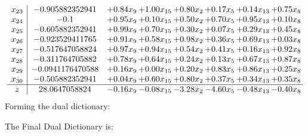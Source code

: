 \documentclass[8pt]{article}
\begin{document}
\[\begin{array}{c| c c@{\hskip 2pt} c@{\hskip 2pt} c@{\hskip 2pt} c@{\hskip 2pt} c@{\hskip 2pt} c@{\hskip 2pt} }
 x_{23}   &  -0.905882352941 & +  0.84 x_{9} & +  1.00 x_{15} & +  0.80 x_{2} & +  0.17 x_{5} & +  0.14 x_{13} & +  0.75 x_{8}\\
 x_{24}   &  -0.1 & +  0.95 x_{9} & +  0.10 x_{15} & +  0.50 x_{2} & +  0.70 x_{5} & +  0.95 x_{13} & +  0.10 x_{8}\\
 x_{25}   &  -0.605882352941 & +  0.99 x_{9} & +  0.70 x_{15} & +  0.30 x_{2} & +  0.07 x_{5} & +  0.29 x_{13} & +  0.45 x_{8}\\
 x_{26}   &  -0.923529411765 & +  0.91 x_{9} & +  0.58 x_{15} & +  0.98 x_{2} & +  0.36 x_{5} & +  0.69 x_{13} & +  0.03 x_{8}\\
 x_{27}   &  -0.517647058824 & +  0.97 x_{9} & +  0.94 x_{15} & +  0.54 x_{2} & +  0.41 x_{5} & +  0.16 x_{13} & +  0.92 x_{8}\\
 x_{28}   &  -0.311764705882 & +  0.78 x_{9} & +  0.64 x_{15} & +  0.24 x_{2} & +  0.13 x_{5} & +  0.67 x_{13} & +  0.87 x_{8}\\
 x_{29}   &  -0.0941176470588 & +  0.16 x_{9} & +  0.00 x_{15} & +  0.20 x_{2} & +  0.83 x_{5} & +  0.86 x_{13} & +  0.25 x_{8}\\
 x_{30}   &  -0.505882352941 & +  0.04 x_{9} & +  0.60 x_{15} & +  0.80 x_{2} & +  0.37 x_{5} & +  0.34 x_{13} & +  0.35 x_{8}\\
\hline
z    &  28.0647058824 & -0.16 x_{9} & -0.08 x_{15} & -3.28 x_{2} & -4.60 x_{5} & -0.48 x_{13} & -0.40 x_{8}\\
\end{array}\]
Forming the dual dictionary:

The Final Dual Dictionary is: 
\end{document}
